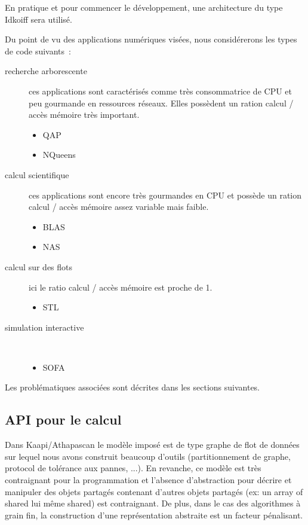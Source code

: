 \documentclass[12pt]{report}
\begin{document}
En pratique et pour commencer le développement, une architecture du type Idkoiff sera utilisé.


Du point de vu des applications numériques visées, nous considérerons les types de code suivants~:
\begin{description}
\item [recherche arborescente] ces applications sont caractérisés comme très consommatrice de CPU et peu gourmande en ressources réseaux. Elles possèdent un ration calcul / accès mémoire très important.
\begin{itemize}
\item QAP
\item NQueens
\end{itemize}

\item [calcul scientifique] ces applications sont encore très gourmandes en CPU et possède un ration calcul / accès mémoire assez variable mais faible.
\begin{itemize}
\item BLAS
\item NAS
\end{itemize}

\item [calcul sur des flots] ici le ratio calcul / accès mémoire est proche de 1.
\begin{itemize}
\item STL
\end{itemize}

\item [simulation interactive] ~\\
\begin{itemize}
\item SOFA
\end{itemize}

\end{description}


Les problématiques associées sont  décrites dans les sections suivantes.
\subsection{API pour le calcul}
Dans Kaapi/Athapascan le modèle imposé est de type graphe de flot de données sur lequel nous avons construit beaucoup d'outils (partitionnement de graphe, protocol de tolérance aux pannes, ...). En revanche, ce modèle est très contraignant pour la programmation et l'absence d'abstraction pour décrire et manipuler des objets partagés contenant d'autres objets partagés (ex: un array of shared lui même shared) est contraignant. De plus, dans le cas des algorithmes à grain fin, la construction d'une représentation abstraite est un facteur pénalisant.
\end{document}
